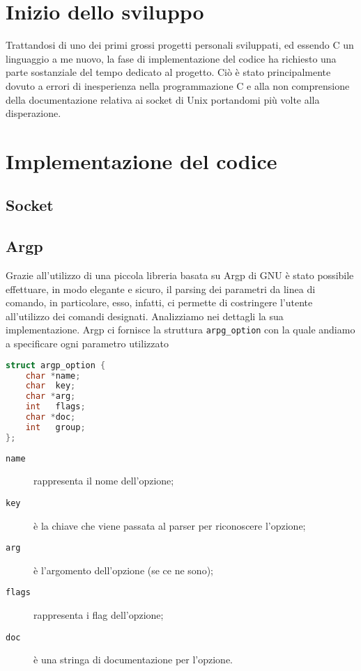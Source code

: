 \documentclass[11pt,fleqn]{book} %
\begin{document}
\section{Inizio dello sviluppo}
Trattandosi di uno dei primi grossi progetti personali sviluppati, ed essendo C un linguaggio a me nuovo, la fase di implementazione del codice ha richiesto una parte sostanziale del tempo dedicato al progetto.
Ciò è stato principalmente dovuto a errori di inesperienza nella programmazione C e alla non comprensione della documentazione relativa ai socket di Unix portandomi più volte alla disperazione.

\section{Implementazione del codice}


\subsection{Socket}

        
\subsection{Argp}
Grazie all'utilizzo di una piccola libreria basata su Argp di GNU  è stato possibile effettuare, in modo elegante e sicuro, il parsing dei parametri da linea di comando, in particolare, esso, infatti, ci permette di costringere l'utente all'utilizzo dei comandi designati. Analizziamo nei dettagli la sua implementazione.
Argp ci fornisce la struttura \texttt{arpg\_option} con la quale andiamo a specificare ogni parametro utilizzato
\begin{lstlisting}[language=C]
struct argp_option {
    char *name;
    char  key;
    char *arg;
    int   flags;
    char *doc;
    int   group;    
};
\end{lstlisting}
\begin{description}
	\item [\texttt{name}] rappresenta il nome dell'opzione;
	\item [\texttt{key}] è la chiave che viene passata al parser per riconoscere l'opzione;
	\item [\texttt{arg}] è l'argomento dell'opzione (se ce ne sono);
	\item [\texttt{flags}] rappresenta i flag dell'opzione;
	\item [\texttt{doc}] è una stringa di documentazione per l'opzione.
\end{description}
\end{document}
